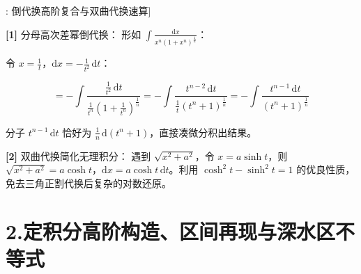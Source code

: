 \documentclass[11pt,a4paper,UTF8]{ctexart}
\begin{document}
\begin{thmbox}[模型[3]: 倒代换高阶复合与双曲代换速算]

\textbf{[1]} 分母高次差幂倒代换：
形如 $\int \frac{\mathrm{d}x}{x^n(1+x^n)^{\frac{1}{n}}}$：

令 $x = \frac{1}{t}$，$\mathrm{d}x = -\frac{1}{t^2}\,\mathrm{d}t$：


\begin{equation*}
= -\int \frac{\frac{1}{t^2}\,\mathrm{d}t}{\frac{1}{t^n}\left(1+\frac{1}{t^n}\right)^{\frac{1}{n}}} = -\int \frac{t^{n-2}\,\mathrm{d}t}{\frac{1}{t}(t^n+1)^{\frac{1}{n}}} = -\int \frac{t^{n-1}\,\mathrm{d}t}{(t^n+1)^{\frac{1}{n}}}
\end{equation*}


分子 $t^{n-1}\,\mathrm{d}t$ 恰好为 $\frac{1}{n}\,\mathrm{d}(t^n+1)$，直接凑微分积出结果。

\textbf{[2]} 双曲代换简化无理积分：
遇到 $\sqrt{x^2+a^2}$，令 $x = a\sinh t$，则 $\sqrt{x^2+a^2} = a\cosh t$，$\mathrm{d}x = a\cosh t\,\mathrm{d}t$。利用 $\cosh^2 t - \sinh^2 t = 1$ 的优良性质，免去三角正割代换后复杂的对数还原。

\end{thmbox}

\section{2.定积分高阶构造、区间再现与深水区不等式}
\end{document}
